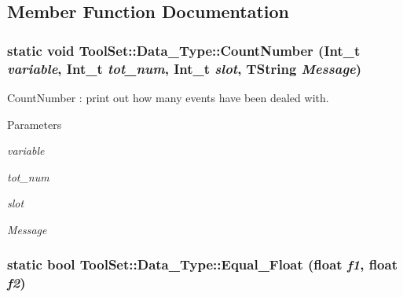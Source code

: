 \subsection{Member Function Documentation}
\hypertarget{classToolSet_1_1Data__Type_ab9c3d77c777ef08fca543e1681472577}{
\subsubsection[{CountNumber}]{\setlength{\rightskip}{0pt plus 5cm}static void ToolSet::Data\_\-Type::CountNumber (Int\_\-t {\em variable}, \/  Int\_\-t {\em tot\_\-num}, \/  Int\_\-t {\em slot}, \/  TString {\em Message})}}
\label{classToolSet_1_1Data__Type_ab9c3d77c777ef08fca543e1681472577}


CountNumber : print out how many events have been dealed with. 
\begin{DoxyParams}{Parameters}
\item[{\em variable}]\item[{\em tot\_\-num}]\item[{\em slot}]\item[{\em Message}]\end{DoxyParams}
\hypertarget{classToolSet_1_1Data__Type_abb19683e0fa26bb65912ede69367587a}{
\subsubsection[{Equal\_\-Float}]{\setlength{\rightskip}{0pt plus 5cm}static bool ToolSet::Data\_\-Type::Equal\_\-Float (float {\em f1}, \/  float {\em f2})}}
\label{classToolSet_1_1Data__Type_abb19683e0fa26bb65912ede69367587a}


